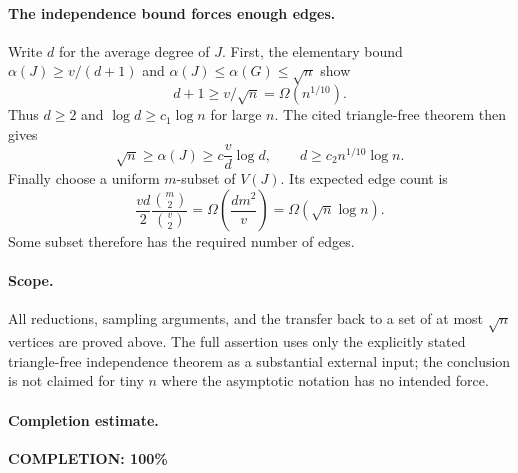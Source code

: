 \paragraph{The independence bound forces enough edges.}
Write \(d\) for the average degree of \(J\).
First, the elementary bound \(\alpha(J)\geq v/(d+1)\)
and \(\alpha(J)\leq\alpha(G)\leq\sqrt n\) show
\[
 d+1\geq v/\sqrt n=\Omega(n^{1/10}).
\]
Thus \(d\geq2\) and \(\log d\geq c_1\log n\) for large \(n\).
The cited triangle-free theorem then gives
\[
 \sqrt n\geq\alpha(J)\geq c\frac vd\log d,
 \qquad d\geq c_2n^{1/10}\log n.
\]
Finally choose a uniform \(m\)-subset of \(V(J)\).
Its expected edge count is
\[
 \frac{vd}{2}\frac{\binom m2}{\binom v2}
 =\Omega\left(\frac{dm^2}{v}\right)
 =\Omega(\sqrt n\log n).
\]
Some subset therefore has the required number of edges.

\paragraph{Scope.}
All reductions, sampling arguments, and the transfer back
to a set of at most \(\sqrt n\) vertices are proved above.
The full assertion uses only the explicitly stated
triangle-free independence theorem as a substantial
external input; the conclusion is not claimed for tiny
\(n\) where the asymptotic notation has no intended force.

\paragraph{Completion estimate.}
\textbf{COMPLETION: 100\%}
